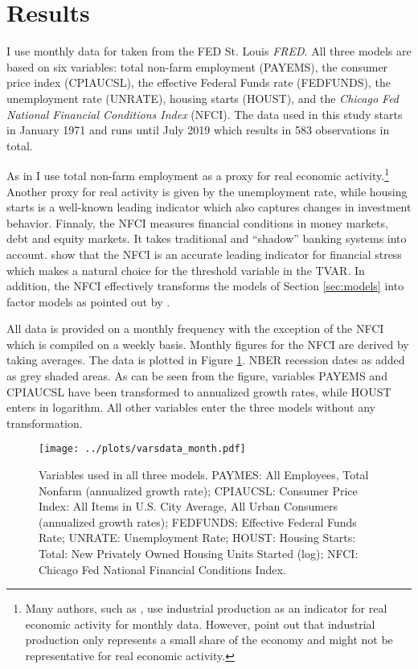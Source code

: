\documentclass[12pt,letterpaper,fleqn]{article}           %
\begin{document}
\section{Results}
\label{sec:results}

I use monthly data for taken from the FED St. Louis \textit{FRED}. All three models are based on six variables: total non-farm employment (PAYEMS), the consumer price index (CPIAUCSL), the effective Federal Funds rate (FEDFUNDS), the unemployment rate (UNRATE), housing starts (HOUST), and the \textit{Chicago Fed National Financial Conditions Index} (NFCI). The data used in this study starts in January 1971 and runs until July 2019 which results in 583 observations in total.

As in \textcite{banbura10} I use total non-farm employment as a proxy for real economic activity.\footnote{Many authors, such as \textcite{alessandri17}, use industrial production as an indicator for real economic activity for monthly data. However, \textcite{hubrich15} point out that industrial production only represents a small share of the economy and might not be representative for real economic activity.} Another proxy for real activity is given by the unemployment rate, while housing starts is a well-known leading indicator which also captures changes in investment behavior. Finnaly, the NFCI measures financial conditions in money markets, debt and equity markets. It takes traditional and ``shadow'' banking systems into account. \textcite{brave12} show that the NFCI is an accurate leading indicator for financial stress which makes a natural choice for the threshold variable in the TVAR. In addition, the NFCI effectively transforms the models of Section \ref{sec:models} into factor models as pointed out by \textcite{alessandri17}.

All data is provided on a monthly frequency with the exception of the NFCI which is compiled on a weekly basis. Monthly figures for the NFCI are derived by taking averages. The data is plotted in Figure \ref{fig:data}. NBER recession dates as added as grey shaded areas. As can be seen from the figure, variables PAYEMS and CPIAUCSL have been transformed to annualized growth rates, while HOUST enters in logarithm. All other variables enter the three models without any transformation. 

\begin{figure}
\captionsetup{singlelinecheck=false, justification=justified}
\centering \texttt{[image: ../plots/varsdata\_month.pdf]} 
\caption{Variables used in all three models. PAYMES: All Employees, Total Nonfarm (annualized growth rate); CPIAUCSL: Consumer Price Index: All Items in U.S. City Average, All Urban Consumers (annualized growth rates); FEDFUNDS: Effective Federal Funds Rate; UNRATE: Unemployment Rate; HOUST: Housing Starts: Total: New Privately Owned Housing Units Started (log); NFCI: Chicago Fed National Financial Conditions Index.}
\label{fig:data} 
\end{figure}
\end{document}
